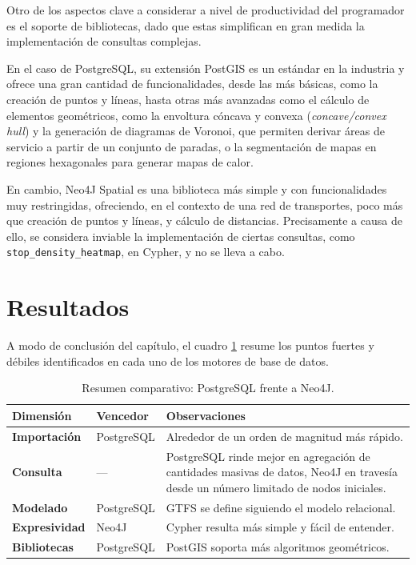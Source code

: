 Otro de los aspectos clave a considerar a nivel de productividad del programador es el soporte de bibliotecas, dado que estas simplifican en gran medida la implementación de consultas complejas.

En el caso de PostgreSQL, su extensión PostGIS es un estándar en la industria y ofrece una gran cantidad de funcionalidades, desde las más básicas, como la creación de puntos y líneas, hasta otras más avanzadas como el cálculo de elementos geométricos, como la envoltura cóncava y convexa (\textit{concave/convex hull}) y la generación de diagramas de Voronoi, que permiten derivar áreas de servicio a partir de un conjunto de paradas, o la segmentación de mapas en regiones hexagonales para generar mapas de calor.

En cambio, Neo4J Spatial es una biblioteca más simple y con funcionalidades muy restringidas, ofreciendo, en el contexto de una red de transportes, poco más que creación de puntos y líneas, y cálculo de distancias. Precisamente a causa de ello, se considera inviable la implementación de ciertas consultas, como \texttt{stop\_density\_heatmap}, en Cypher, y no se lleva a cabo.



\section{Resultados}

A modo de conclusión del capítulo, el cuadro \ref{comparison:results} resume los puntos fuertes y débiles identificados en cada uno de los motores de base de datos.

\vspace{1em}

\begin{table}[H]
    \centering
    \renewcommand{\arraystretch}{1.3}
    \begin{tabular}{@{}llp{8.5cm}@{}}
        \toprule
        \textbf{Dimensión} & \textbf{Vencedor} & \textbf{Observaciones} \\
        \midrule
        \textbf{Importación} & PostgreSQL & Alrededor de un orden de magnitud más rápido. \\
        \textbf{Consulta} & — & PostgreSQL rinde mejor en agregación de cantidades masivas de datos, Neo4J en travesía desde un número limitado de nodos iniciales. \\
        \textbf{Modelado} & PostgreSQL & GTFS se define siguiendo el modelo relacional. \\
        \textbf{Expresividad} & Neo4J & Cypher resulta más simple y fácil de entender. \\
        \textbf{Bibliotecas} & PostgreSQL & PostGIS soporta más algoritmos geométricos. \\
        \bottomrule
    \end{tabular}
    \caption{Resumen comparativo: PostgreSQL frente a Neo4J.}
    \label{comparison:results}
\end{table}
